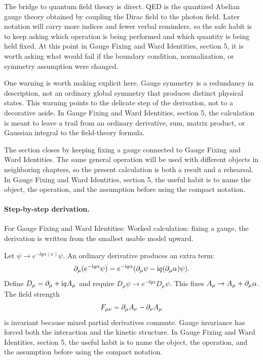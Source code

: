 The bridge to quantum field theory is direct.  QED is the quantized Abelian gauge theory obtained by coupling the Dirac field to the photon field.  Later notation will carry more indices and fewer verbal reminders, so the safe habit is to keep asking which operation is being performed and which quantity is being held fixed.  At this point in Gauge Fixing and Ward Identities, section 5, it is worth asking what would fail if the boundary condition, normalization, or symmetry assumption were changed.

One warning is worth making explicit here.  Gauge symmetry is a redundancy in description, not an ordinary global symmetry that produces distinct physical states.  This warning points to the delicate step of the derivation, not to a decorative aside.  In Gauge Fixing and Ward Identities, section 5, the calculation is meant to leave a trail from an ordinary derivative, sum, matrix product, or Gaussian integral to the field-theory formula.

The section closes by keeping fixing a gauge connected to Gauge Fixing and Ward Identities.  The same general operation will be used with different objects in neighboring chapters, so the present calculation is both a result and a rehearsal.  In Gauge Fixing and Ward Identities, section 5, the useful habit is to name the object, the operation, and the assumption before using the compact notation.



\paragraph{Step-by-step derivation.}

For Gauge Fixing and Ward Identities: Worked calculation: fixing a gauge, the derivation is written from the smallest usable model upward.

Let \(\psi\to e^{-\ii q\alpha(x)}\psi\).  An ordinary derivative produces an extra term:
\[
  \partial_\mu(e^{-\mathrm i q\alpha}\psi)
  =
  e^{-\mathrm i q\alpha}(\partial_\mu\psi-\mathrm i q(\partial_\mu\alpha)\psi).
\]
Define \(D_\mu=\partial_\mu+\mathrm i qA_\mu\) and require \(D_\mu\psi\to e^{-\ii q\alpha}D_\mu\psi\).  This fixes \(A_\mu\to A_\mu+\partial_\mu\alpha\).  The field strength
\[
  F_{\mu\nu}=\partial_\mu A_\nu-\partial_\nu A_\mu
\]
is invariant because mixed partial derivatives commute.  Gauge invariance has forced both the interaction and the kinetic structure.  In Gauge Fixing and Ward Identities, section 5, the useful habit is to name the object, the operation, and the assumption before using the compact notation.

